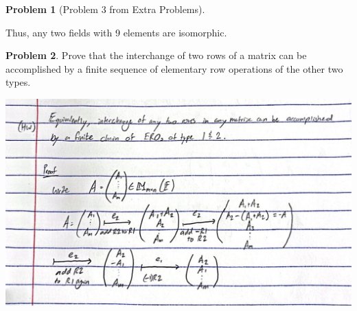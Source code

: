 \documentclass[12pt]{article}
\theoremstyle{definition}
\newtheorem{problem}{Problem}
\begin{document}
\begin{problem}[Problem 3 from Extra Problems]
\begin{solution}
        Thus, any two fields with 9 elements are isomorphic.
    \end{solution}

\end{problem}

\begin{problem}
    Prove that the interchange of two rows of a matrix can be accomplished by a finite sequence of elementary row operations of the other two types.
    
    \begin{solution}
        \includegraphics[scale=0.25]{p7.jpg}
    \end{solution}
\end{problem}

\clearpage
\end{document}

